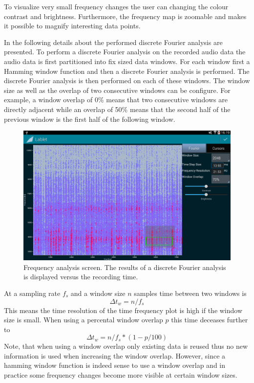 \documentclass{sigchi}
\begin{document}
To visualize very small frequency changes the user can changing the colour contrast and brightness.
Furthermore, the frequency map is zoomable and makes it possible to magnify interesting data points.

In the following details about the performed discrete Fourier analysis are presented.
To perform a discrete Fourier analysis on the recorded audio data the audio data is first partitioned into fix sized data windows.
For each window first a Hamming window function and then a discrete Fourier analysis is performed.
The discrete Fourier analysis is then performed on each of these windows.
The window size as well as the overlap of two consecutive windows can be configure.
For example, a window overlap of 0\% means that two consecutive windows are directly adjacent while an overlap of 50\% means that the second half of the previous window is the first half of the following window.


\begin{figure}
  \centering
  \includegraphics[width=.99\columnwidth]{FrequencyAnalysis}
  \caption{Frequency analysis screen.
  The results of a discrete Fourier analysis is displayed versus the recording time.\label{fig:FrequencyAnalysis}}
\end{figure}

At a sampling rate $f_s$ and a window size $n$ samples time between two windows is
\[
\Delta t_w = n / f_s
\]
This means the time resolution of the time frequency plot is high if
the window size is small.  When using a percental window overlap $p$
this time deceases further to
\[
\Delta t_w = n / f_s * (1 - p / 100)
\]
Note, that when using a window overlap only existing data is reused
thus no new information is used when increasing the window overlap.
However, since a hamming window function is indeed sense to use a
window overlap and in practice some frequency changes become more
visible at certain window sizes.
\end{document}
